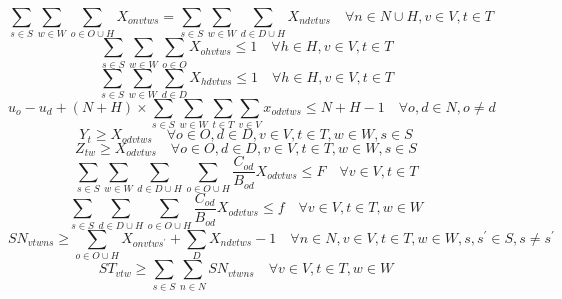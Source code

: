 \documentclass[numbered]{trbunofficial}
\begin{document}
\begin{equation}
    \qquad 
    \sum_{s\in S} \sum_{w\in W} \sum_{o\in O\cup H} X_{o n v t w s} = \sum_{s\in S} \sum_{w\in W} \sum_{d\in D\cup H} X_{n d v t w s} \quad \forall n \in N\cup H, v \in V, t \in T \label{eq:4}
\end{equation}
\begin{equation}
    \qquad 
    \sum_{s\in S} \sum_{w\in W} \sum_{o\in O} X_{o h v t w s} \leq 1 \quad \forall h \in H, v \in V, t \in T\label{eq:5}
\end{equation}
\begin{equation}
    \qquad 
    \sum_{s\in S} \sum_{w\in W} \sum_{d\in D} X_{h d v t w s} \leq 1 \quad \forall h \in H, v \in V, t \in T \label{eq:6}
\end{equation}
\begin{equation}
    \qquad 
    u_{o}-u_{d}+(N+H)\times \sum_{s\in S} \sum_{w\in W} \sum_{t\in T} \sum_{v\in V} x_{o d v t w s} \leq N+H-1 \quad \forall o,d \in N, o \neq d \label{eq:7}
\end{equation}
\begin{equation}
    \qquad 
    Y_{t} \geq X_{o d v t w s} \quad \forall o \in O, d \in D, v \in V, t \in T, w \in W, s \in S \label{eq:8}
\end{equation}
\begin{equation}
    \qquad 
    Z_{t w} \geq X_{o d v t w s} \quad \forall o \in O, d \in D, v \in V, t \in T, w \in W, s \in S \label{eq:9}
\end{equation}
\begin{equation}
    \qquad 
    \sum_{s\in S} \sum_{w\in W} \sum_{d\in D\cup H} \sum_{o\in O\cup H} \frac{C_{o d}}{B_{o d}} X_{o d v t w s} \leq F \quad \forall v \in V, t \in T \label{eq:10}
\end{equation}
\begin{equation}
    \qquad 
    \sum_{s\in S} \sum_{d\in D\cup H} \sum_{o\in O\cup H} \frac{C_{o d}}{B_{o d}} X_{o d v t w s} \leq f \quad \forall v \in V, t \in T, w \in W \label{eq:11}
\end{equation}
\begin{equation}
    \qquad 
    S N_{v t w n s} \geq \sum_{o\in O\cup H} X_{o n v t w s^{\prime}}+\sum_{D} X_{n d v t w s}-1 \quad \forall n \in N, v \in V, t \in T, w \in W, s,s^{\prime} \in S, s\neq s^{\prime} \label{eq:12}
\end{equation}
\begin{equation}
    \qquad 
    S T_{v t w} \geq \sum_{s\in S} \sum_{n\in N} S N_{v t w n s} \quad \forall v \in V, t \in T, w\in W \label{eq:13}
\end{equation}
\end{document}
